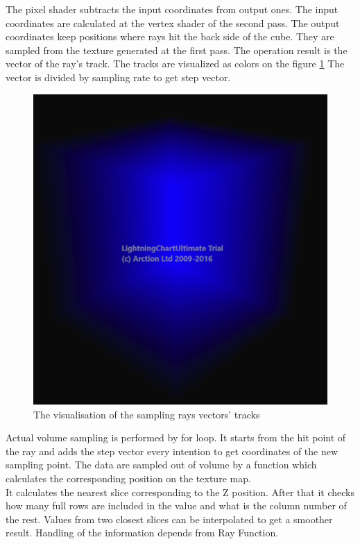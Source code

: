\documentclass[twoside, english, 11pt]{report}
\begin{document}
The pixel shader subtracts the input coordinates from output ones. The input coordinates are calculated at the vertex shader of the second pass. The output coordinates keep positions where rays hit the back side of the cube. They are sampled from the texture generated at the first pass. The operation result is the vector of the ray's track. The tracks are visualized as colors on the figure \ref{fig:final} The vector is divided by sampling rate to get step vector.
\begin{figure}[!h]
\centerline{\includegraphics[scale = 0.5]{img/final}}
\caption{The visualisation of the sampling rays vectors' tracks \label{fig:final}}
\end{figure}
Actual volume sampling is performed by for loop. It starts from the hit point of the ray and adds the step vector every intention to get coordinates of the new sampling point. The data are sampled out of volume by a function which calculates the corresponding position on the texture map.\\

It calculates the nearest slice corresponding to the Z position. After that it checks how many full rows are included in the value and what is the column number of the rest. Values from two closest slices can be interpolated to get a smoother result. Handling of the information depends from Ray Function.\\
\end{document}
